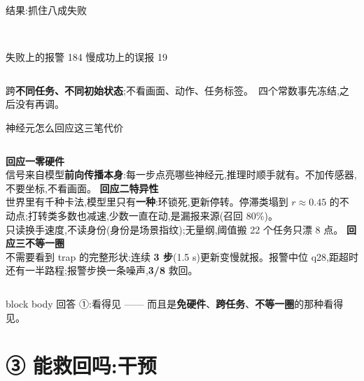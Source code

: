 \documentclass[aspectratio=169,10pt]{beamer}
\newcommand{\hi}[1]{{\color{teai}\bfseries #1}}
\newcommand{\dimm}[1]{{\footnotesize\color{mute}#1}}
\newcommand{\takeaway}[1]{%
  \begin{center}\begin{beamercolorbox}[wd=.94\textwidth,sep=6pt,rounded=true]{block body}%
  \centering #1\end{beamercolorbox}\end{center}}
\begin{document}
\begin{frame}{结果:抓住八成失败}
\begin{columns}[T]
\\[2pt]
      \dimm{{\color{alertc}$\blacksquare$} 失败上的报警 184\quad {\color{accent}$\blacksquare$} 慢成功上的误报 19}
  \end{columns}
  \vspace{5pt}
  \begin{center}\small 跨\textbf{不同任务、不同初始状态};不看画面、动作、任务标签。\ \dimm{四个常数事先冻结,之后没有再调。}\end{center}
\end{frame}

\begin{frame}{神经元怎么回应这三笔代价}
  \vspace{1mm}
  \begin{columns}[T]
      {\color{teai}\bfseries 回应一\quad 零硬件}\\[4pt]
      \small 信号来自模型\textbf{前向传播本身}:每一步点亮哪些神经元,推理时顺手就有。不加传感器,不要坐标,不看画面。
      {\color{teai}\bfseries 回应二\quad 特异性}\\[4pt]
      \small 世界里有千种卡法,模型里只有\textbf{一种}:环锁死,更新停转。停滞类塌到 $r{\approx}0.45$ 的不动点;打转类多数也减速,少数一直在动,是漏报来源(召回 80\%)。\\[4pt]
      \dimm{只读换手速度,不读身份(身份是场景指纹);无量纲,阈值搬 22 个任务只漂 8 点。}
      {\color{teai}\bfseries 回应三\quad 不等一圈}\\[4pt]
      \small 不需要看到 trap 的完整形状:连续 \textbf{3 步}(1.5 s)更新变慢就报。报警中位 q28,距超时还有一半路程;报警步换一条噪声,\hi{3/8} 救回。
  \end{columns}
  \vspace{2pt}
  \takeaway{\small 回答 ①:看得见 —— 而且是\hi{免硬件}、\hi{跨任务}、\hi{不等一圈}的那种看得见。}
\end{frame}


\section{③ 能救回吗:干预}
\end{document}
